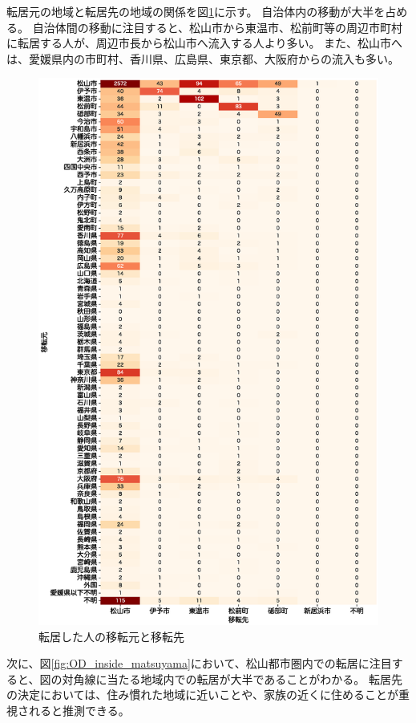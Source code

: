 \documentclass[a4paper,12pt, uplatex]{jsbook}
\begin{document}
転居元の地域と転居先の地域の関係を図\ref{fig:OD_relocated_people}に示す。
自治体内の移動が大半を占める。
自治体間の移動に注目すると、松山市から東温市、松前町等の周辺市町村に転居する人が、周辺市長から松山市へ流入する人より多い。
また、松山市へは、愛媛県内の市町村、香川県、広島県、東京都、大阪府からの流入も多い。
\begin{figure}[H]
    \centering
    \includegraphics[width=\textwidth]{picture/OD_relocated_people.eps}
    \caption{転居した人の移転元と移転先}
    \label{fig:OD_relocated_people}
\end{figure}

次に、図\ref{fig:OD_inside_matsuyama}において、松山都市圏内での転居に注目すると、図の対角線に当たる地域内での転居が大半であることがわかる。
転居先の決定においては、住み慣れた地域に近いことや、家族の近くに住めることが重視されると推測できる。
\end{document}
